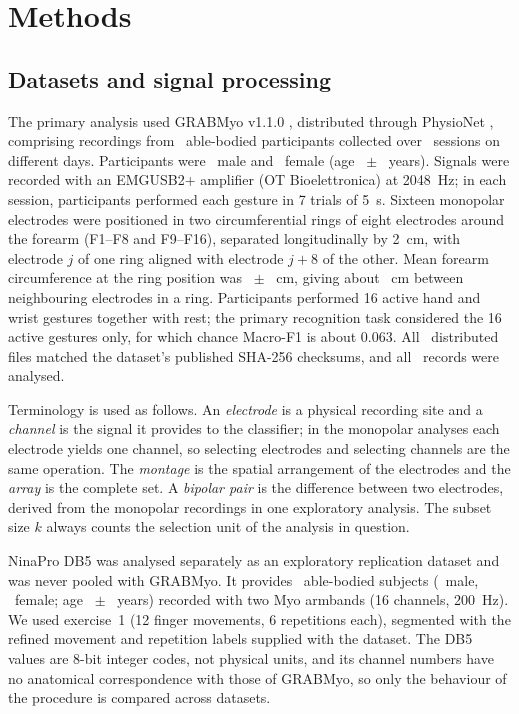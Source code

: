 \section{Methods}
\label{sec:methods}

\subsection[Datasets and signal processing]{Datasets and signal processing}
\label{sec:datasets}

The primary analysis used GRABMyo v1.1.0 \citep{pradhan2022multiday,jiang2024grabmyo}, distributed through PhysioNet \citep{goldberger2000physionet}, comprising recordings from \GRABMyoParticipants\ able-bodied participants collected over \GRABMyoSessions\ sessions on different days. Participants were \GRABMyoMale\ male and \GRABMyoFemale\ female (age \GRABMyoAgeMean\ $\pm$ \GRABMyoAgeSD\ years). Signals were recorded with an EMGUSB2+ amplifier (OT Bioelettronica) at 2048~Hz; in each session, participants performed each gesture in 7 trials of 5~s. Sixteen monopolar electrodes were positioned in two circumferential rings of eight electrodes around the forearm (F1--F8 and F9--F16), separated longitudinally by 2~cm, with electrode $j$ of one ring aligned with electrode $j+8$ of the other. Mean forearm circumference at the ring position was \GRABMyoCircMean\ $\pm$ \GRABMyoCircSD~cm, giving about \GRABMyoArcSpacing~cm between neighbouring electrodes in a ring. Participants performed 16 active hand and wrist gestures together with rest; the primary recognition task considered the 16 active gestures only, for which chance Macro-F1 is about 0.063. All \GRABMyoFilesVerified\ distributed files matched the dataset's published SHA-256 checksums, and all \GRABMyoRecords\ records were analysed.

Terminology is used as follows. An \emph{electrode} is a physical recording site and a \emph{channel} is the signal it provides to the classifier; in the monopolar analyses each electrode yields one channel, so selecting electrodes and selecting channels are the same operation. The \emph{montage} is the spatial arrangement of the electrodes and the \emph{array} is the complete set. A \emph{bipolar pair} is the difference between two electrodes, derived from the monopolar recordings in one exploratory analysis. The subset size $k$ always counts the selection unit of the analysis in question.

NinaPro DB5 \citep{pizzolato2017comparison} was analysed separately as an exploratory replication dataset and was never pooled with GRABMyo. It provides \DBFiveSubjects\ able-bodied subjects (\DBFiveMale\ male, \DBFiveFemale\ female; age \DBFiveAgeMean\ $\pm$ \DBFiveAgeSD\ years) recorded with two Myo armbands (16 channels, 200~Hz). We used exercise~1 (12 finger movements, 6 repetitions each), segmented with the refined movement and repetition labels supplied with the dataset. The DB5 values are 8-bit integer codes, not physical units, and its channel numbers have no anatomical correspondence with those of GRABMyo, so only the behaviour of the procedure is compared across datasets.

